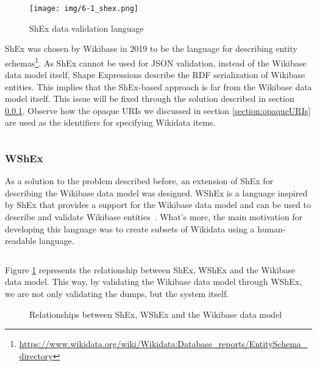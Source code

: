 \begin{figure}[ht]
    \centering
    \texttt{[image: img/6-1\_shex.png]}
    \caption{ShEx data validation language}
\end{figure}

ShEx was chosen by Wikibase in 2019 to be the language for describing entity schemas\footnote{\url{https://www.wikidata.org/wiki/Wikidata:Database_reports/EntitySchema_directory}}. As ShEx cannot be used for JSON validation, instead of the Wikibase data model itself, Shape Expressions describe the RDF serialization of Wikibase entities. This implies that the ShEx-based approach is far from the Wikibase data model itself. This issue will be fixed through the solution described in section \ref{section:WShEx}. Observe how the opaque URIs we discussed in section \ref{section:opaqueURIs} are used as the identifiers for specifying Wikidata items.

\begin{code}
    \inputminted{shex}{code/listings/6-5_wikibase.shex}
\end{code}

\subsubsection{WShEx}
\label{section:WShEx}

As a solution to the problem described before, an extension of ShEx for describing the Wikibase data model was designed. WShEx is a language inspired by ShEx that provides a support for the Wikibase data model and can be used to describe and validate Wikibase entities~\cite{https://doi.org/10.48550/arxiv.2208.02697}. What's more, the main motivation for developing this language was to create subsets of Wikidata using a human-readable language.

\begin{code}
    \inputminted{shex}{code/listings/6-6_wshex.shex}
\end{code}

Figure \ref{fig:WShEx} represents the relationship between ShEx, WShEx and the Wikibase data model. This way, by validating the Wikibase data model through WShEx, we are not only validating the dumps, but the system itself.

\begin{figure}[ht]
    \centering
    
    \caption[Relationships between ShEx, WShEx and the Wikibase data model]{Relationships between ShEx, WShEx and the Wikibase data model~\cite{https://doi.org/10.48550/arxiv.2110.11709}}
    \label{fig:WShEx}
\end{figure}

